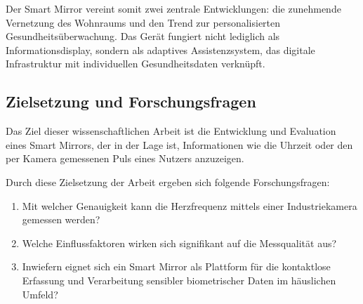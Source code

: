 Der Smart Mirror vereint somit zwei zentrale Entwicklungen: die zunehmende Vernetzung des Wohnraums und den Trend zur personalisierten Gesundheitsüberwachung. Das Gerät fungiert nicht lediglich als Informationsdisplay, sondern als adaptives Assistenzsystem, das digitale Infrastruktur mit individuellen Gesundheitsdaten verknüpft. 

\subsection*{Zielsetzung und Forschungsfragen}

Das Ziel dieser wissenschaftlichen Arbeit ist die Entwicklung und Evaluation eines Smart Mirrors, der in der Lage ist, Informationen wie die Uhrzeit oder den per Kamera gemessenen Puls eines Nutzers anzuzeigen.

Durch diese Zielsetzung der Arbeit ergeben sich folgende Forschungsfragen:

\begin{enumerate}[label = \roman*., leftmargin = 6em]
    \item Mit welcher Genauigkeit kann die Herzfrequenz mittels einer Industriekamera gemessen werden?
    \item Welche Einflussfaktoren wirken sich signifikant auf die Messqualität aus?
    \item Inwiefern eignet sich ein Smart Mirror als Plattform für die kontaktlose Erfassung und Verarbeitung sensibler biometrischer Daten im häuslichen Umfeld?
\end{enumerate}
